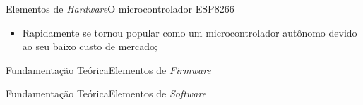 \begin{frame}{Elementos de \textit{Hardware}}{O microcontrolador ESP8266}
    \begin{itemize}
        \item Rapidamente se tornou popular como um microcontrolador autônomo devido ao seu baixo custo de mercado;
    \end{itemize}

\end{frame}

\begin{frame}{Fundamentação Teórica}{Elementos de \textit{Firmware}}
\end{frame}

\begin{frame}{Fundamentação Teórica}{Elementos de \textit{Software}}
\end{frame}